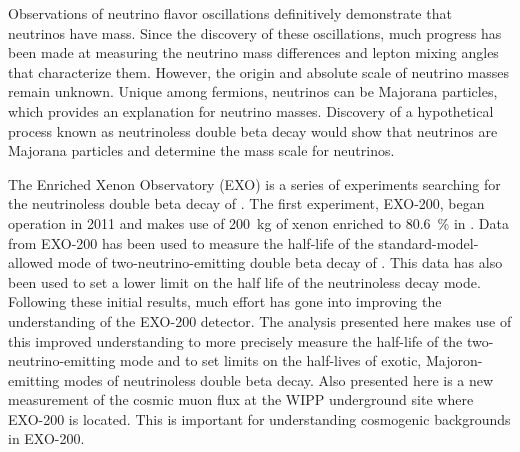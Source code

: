 Observations of neutrino flavor oscillations definitively demonstrate that neutrinos have mass. Since the discovery of these oscillations, much progress has been made at measuring the neutrino mass differences and lepton mixing angles that characterize them. However, the origin and absolute scale of neutrino masses remain unknown. Unique among fermions, neutrinos can be Majorana particles, which provides an explanation for neutrino masses. Discovery of a hypothetical process known as neutrinoless double beta decay would show that neutrinos are Majorana particles and determine the mass scale for neutrinos.

The Enriched Xenon Observatory (EXO) is a series of experiments searching for the neutrinoless double beta decay of . The first experiment, EXO-200, began operation in 2011 and makes use of \SI{200}{\kg} of xenon enriched to \SI{80.6}{\percent} in . Data from EXO-200 has been used to measure the half-life of the standard-model-allowed mode of two-neutrino-emitting double beta decay of . This data has also been used to set a lower limit on the half life of the neutrinoless decay mode. Following these initial results, much effort has gone into improving the understanding of the EXO-200 detector. The analysis presented here makes use of this improved understanding to more precisely measure the half-life of the two-neutrino-emitting mode and to set limits on the half-lives of exotic, Majoron-emitting modes of neutrinoless double beta decay. Also presented here is a new measurement of the cosmic muon flux at the WIPP underground site where EXO-200 is located. This is important for understanding cosmogenic backgrounds in EXO-200.
